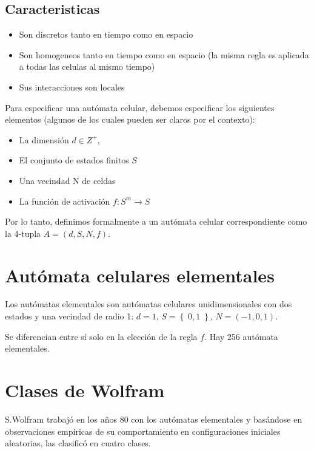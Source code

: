 \documentclass[12pt, fleqn]{report}                             %
\theoremstyle{break}                                            %
\newcommand{\Set}[1]            {\left\{ \; #1 \; \right\}}     %
\begin{document}
      \subsection{Caracteristicas}
      \begin{itemize}
        \item Son discretos tanto en tiempo como en espacio
        \item Son homogeneos tanto en tiempo como en espacio 
        (la misma regla es aplicada a todas las celulas al mismo tiempo)
        \item Sus interacciones son locales
      \end{itemize}

      Para especificar una autómata celular, debemos especificar los siguientes 
      elementos (algunos de los cuales pueden ser claros por el contexto):
      \begin{itemize}
        \item La dimensión $d \in Z^+$,
        \item El conjunto de estados finitos $S$
        \item Una vecindad N de celdas
        \item La función de activación $f: S^m \to S$
      \end{itemize}

      Por lo tanto, definimos formalmente a un autómata celular 
      correspondiente como la 4-tupla $A = (d, S, N, f)$.

      \section{Autómata celulares elementales}

      Los autómatas elementales son autómatas celulares unidimensionales con dos estados y una
      vecindad de radio 1: $d = 1$, $S = \Set{0, 1}$, $N = (-1, 0, 1)$.
      
      Se diferencian entre sí solo en la elección de la regla $f$. 
      Hay 256 autómata elementales.

      \section{Clases de Wolfram}

      S.Wolfram trabajó en los años 80 con los autómatas elementales y basándose en observaciones empíricas 
      de su comportamiento en configuraciones iniciales aleatorias, las clasificó en cuatro clases.
\end{document}
